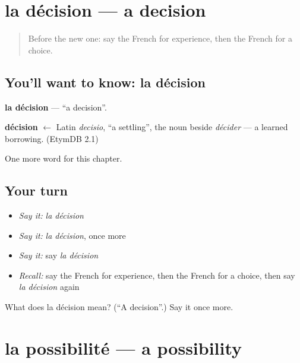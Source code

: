 \section[la décision]{la décision — a decision}

\label{lesson:FR-C225-decision}



\begin{quote}
Before the new one: say the French for experience, then the French for a choice.
\end{quote}

\subsection*{You'll want to know: la décision}
\textbf{la décision} — \textquotedblleft{}a decision\textquotedblright{}.

\begin{cousinweb}
\textbf{décision} $\leftarrow$ Latin \emph{decisio}, \textquotedblleft{}a settling\textquotedblright{}, the noun beside \emph{décider} — a learned borrowing. (EtymDB 2.1)
\end{cousinweb}

\begin{grammarlens}[title={What you've built}]
One more word for this chapter.
\end{grammarlens}

\subsection*{Your turn}
\begin{itemize}
\raggedright
  \item \emph{Say it:} \emph{la décision}
  \item \emph{Say it:} \emph{la décision}, once more
  \item \emph{Say it:} say \emph{la décision}
  \item \emph{Recall:} say the French for experience, then the French for a choice, then say \emph{la décision} again
\end{itemize}

\begin{tcolorbox}[breakable,colback=teal!4,colframe=teal!35!black,title={Before you move on}]
What does la décision mean? (\textquotedblleft{}A decision\textquotedblright{}.) Say it once more.
\end{tcolorbox}
\section[la possibilité]{la possibilité — a possibility}

